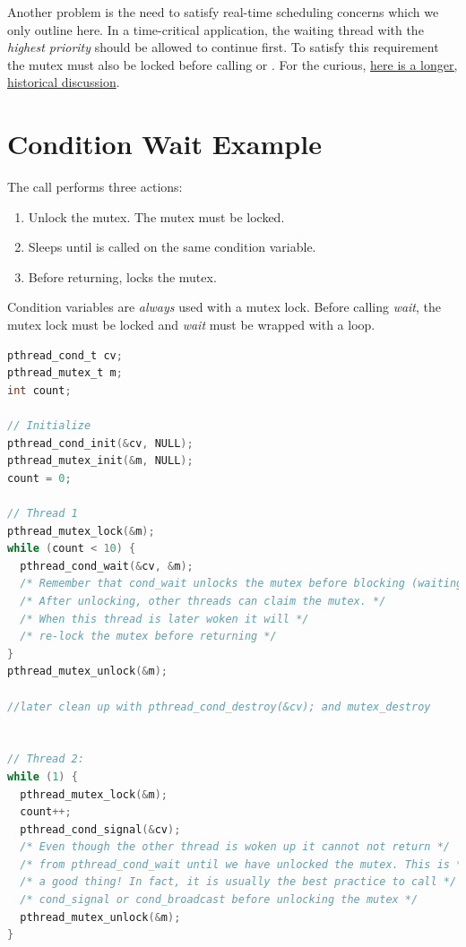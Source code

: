 Another problem is the need to satisfy real-time scheduling concerns which we only outline here.
In a time-critical application, the waiting thread with the \emph{highest priority} should be allowed to continue first.
To satisfy this requirement the mutex must also be locked before calling  or .
For the curious, \href{https://groups.google.com/forum/?hl=ky\#!msg/comp.programming.threads/wEUgPq541v8/ZByyyS8acqMJ}{here is a longer, historical discussion}.

\section{Condition Wait Example}

The call  performs three actions:

\begin{enumerate}
\item Unlock the mutex. The mutex must be locked.
\item Sleeps until  is called on the same condition variable.
\item Before returning, locks the mutex.
\end{enumerate}

Condition variables are \emph{always} used with a mutex lock.
Before calling \emph{wait}, the mutex lock must be locked and \emph{wait} must be wrapped with a loop.

\begin{lstlisting}[language=C]
pthread_cond_t cv;
pthread_mutex_t m;
int count;

// Initialize
pthread_cond_init(&cv, NULL);
pthread_mutex_init(&m, NULL);
count = 0;

// Thread 1
pthread_mutex_lock(&m);
while (count < 10) {
  pthread_cond_wait(&cv, &m);
  /* Remember that cond_wait unlocks the mutex before blocking (waiting)! */
  /* After unlocking, other threads can claim the mutex. */
  /* When this thread is later woken it will */
  /* re-lock the mutex before returning */
}
pthread_mutex_unlock(&m);

//later clean up with pthread_cond_destroy(&cv); and mutex_destroy


// Thread 2:
while (1) {
  pthread_mutex_lock(&m);
  count++;
  pthread_cond_signal(&cv);
  /* Even though the other thread is woken up it cannot not return */
  /* from pthread_cond_wait until we have unlocked the mutex. This is */
  /* a good thing! In fact, it is usually the best practice to call */
  /* cond_signal or cond_broadcast before unlocking the mutex */
  pthread_mutex_unlock(&m);
}
\end{lstlisting}

